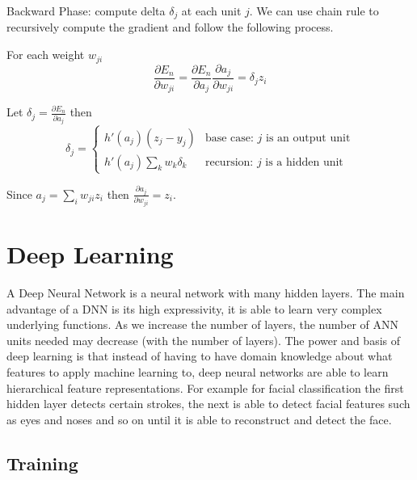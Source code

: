 \documentclass[12pt]{article}
\begin{document}
                Backward Phase: compute delta $\delta_j$ at each unit $j$. We can use chain rule to recursively compute
                the gradient and follow the following process.
                
                For each weight $w_{ji}$
                $$ \frac{\partial E_n}{\partial w_{ji}} = \frac{\partial E_n}{\partial a_{j}} \frac{\partial
                a_j}{\partial w_{ji}} = \delta_{j} z_i $$ 

                Let $\delta_j = \frac{\partial E_n}{\partial a_{j}}$ then
                \[ \delta_j = \begin{cases} 
                    h'(a_j)(z_j - y_j) & \text{base case: $j$ is an output unit} \\
                    h'(a_j)\sum_k w_k \delta_k & \text{recursion: $j$ is a hidden unit}
                    \end{cases}
                \]
                
                Since $a_j = \sum_i w_{ji}z_i$ then $\frac{\partial a_j}{\partial w_{ji}} = z_i$.

\section{Deep Learning}
    A Deep Neural Network is a neural network with many hidden layers. The main advantage of a DNN is its high
    expressivity, it is able to learn very complex underlying functions. As we increase the number of layers, the number
    of ANN units needed may decrease (with the number of layers). The power and basis of deep learning is that instead
    of having to have domain knowledge about what features to apply machine learning to, deep neural networks are able
    to learn hierarchical feature representations. For example for facial classification the first hidden layer detects
    certain strokes, the next is able to detect facial features such as eyes and noses and so on until it is able to
    reconstruct and detect the face.
    
    \subsection{Training}
\end{document}
